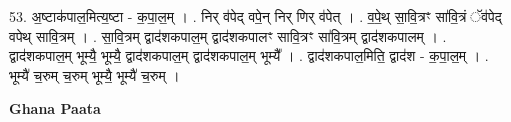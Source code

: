 \documentclass[17pt]{extarticle}
\begin{document}
53. अ॒ष्टाक॑पाल॒मित्य॒ष्टा - क॒पा॒ल॒म् । . निर् व॑पेद् वपे॒न् निर् णिर् व॑पेत् । . व॒पे॒थ् सा॒वि॒त्रꣳ सा॑वि॒त्रं ॅव॑पेद् वपेथ् सावि॒त्रम् । . सा॒वि॒त्रम् द्वाद॑शकपाल॒म् द्वाद॑शकपालꣳ सावि॒त्रꣳ सा॑वि॒त्रम् द्वाद॑शकपालम् । . द्वाद॑शकपाल॒म् भूम्यै॒ भूम्यै॒ द्वाद॑शकपाल॒म् द्वाद॑शकपाल॒म् भूम्यै᳚ । . द्वाद॑शकपाल॒मिति॒ द्वाद॑श - क॒पा॒ल॒म् । . भूम्यै॑ च॒रुम् च॒रुम् भूम्यै॒ भूम्यै॑ च॒रुम् । \newline

\textbf{Ghana Paata } \newline
\end{document}
